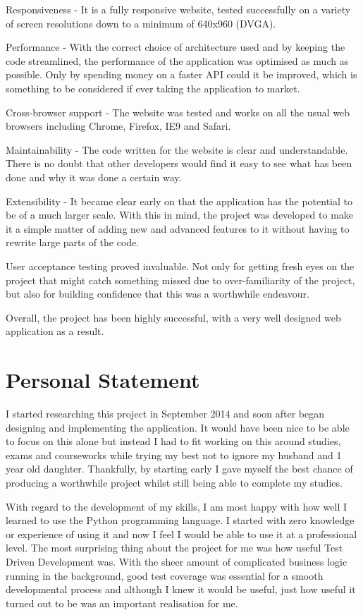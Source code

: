Responsiveness - It is a fully responsive website, tested successfully on a variety of screen resolutions down to a minimum of 640x960 (DVGA).

Performance - With the correct choice of architecture used and by keeping the code streamlined, the performance of the application was optimised as much as possible. Only by spending money on a faster API could it be improved, which is something to be considered if ever taking the application to market.

Cross-browser support - The website was tested and works on all the usual web browsers including Chrome, Firefox, IE9 and Safari.

Maintainability - The code written for the website is clear and understandable.  There is no doubt that other developers would find it easy to see what has been done and why it was done a certain way.

Extensibility - It became clear early on that the application has the potential to be of a much larger scale.  With this in mind, the project was developed to make it a simple matter of adding new and advanced features to it without having to rewrite large parts of the code.

User acceptance testing proved invaluable.  Not only for getting fresh eyes on the project that might catch something missed due to over-familiarity of the project, but also for building confidence that this was a worthwhile endeavour.

Overall, the project has been highly successful, with a very well designed web application as a result.

\section{Personal Statement}
\label{sec:personalstatement_conclusion}

I started researching this project in September 2014 and soon after began designing and implementing the application. It would have been nice to be able to focus on this alone but instead I had to fit working on this around studies, exams and courseworks while trying my best not to ignore my husband and 1 year old daughter.  Thankfully, by starting early I gave myself the best chance of producing a worthwhile project whilst still being able to complete my studies.

With regard to the development of my skills, I am most happy with how well I learned to use the Python programming language. I started with zero knowledge or experience of using it and now I feel I would be able to use it at a professional level. The most surprising thing about the project for me was how useful Test Driven Development was. With the sheer amount of complicated business logic running in the background, good test coverage was essential for a smooth developmental process and although I knew it would be useful, just how useful it turned out to be was an important realisation for me. 

